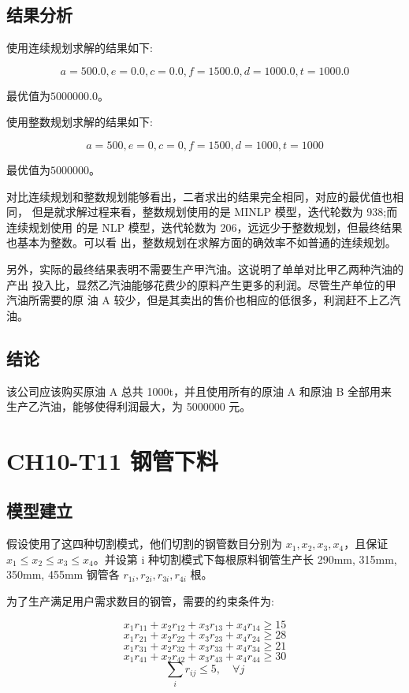 \documentclass{article}
\begin{document}
\subsection{结果分析}

使用连续规划求解的结果如下:

$$a=500.0,e=0.0,c=0.0,f=1500.0,d=1000.0,t=1000.0$$

最优值为$5000000.0$。

使用整数规划求解的结果如下:

$$a=500,e=0,c=0,f=1500,d=1000,t=1000$$

最优值为$5000000$。

对比连续规划和整数规划能够看出，二者求出的结果完全相同，对应的最优值也相同， 但是就求解过程来看，整数规划使用的是 MINLP 模型，迭代轮数为 938;而连续规划使用 的是 NLP 模型，迭代轮数为 206，远远少于整数规划，但最终结果也基本为整数。可以看 出，整数规划在求解方面的确效率不如普通的连续规划。


另外，实际的最终结果表明不需要生产甲汽油。这说明了单单对比甲乙两种汽油的产出 投入比，显然乙汽油能够花费少的原料产生更多的利润。尽管生产单位的甲汽油所需要的原 油 A 较少，但是其卖出的售价也相应的低很多，利润赶不上乙汽油。


\subsection{结论}

该公司应该购买原油 A 总共 1000t，并且使用所有的原油 A 和原油 B 全部用来 生产乙汽油，能够使得利润最大，为 5000000 元。


\section{CH10-T11 钢管下料}

\subsection{模型建立}
假设使用了这四种切割模式，他们切割的钢管数目分别为 $x_1, x_2, x_3, x_4$，且保证 $x_1 \leq x_2 \leq x_3 \leq x_4$。并设第 i 种切割模式下每根原料钢管生产长 290mm, 315mm, 350mm, 455mm 钢管各 $r_{1i}, r_{2i}, r_{3i}, r_{4i}$ 根。

为了生产满足用户需求数目的钢管，需要的约束条件为:

$$x_1r_{11}+x_2r_{12}+x_3r_{13}+x_4r_{14}\geq 15$$
$$x_1r_{21}+x_2r_{22}+x_3r_{23}+x_4r_{24}\geq 28$$
$$x_1r_{31}+x_2r_{32}+x_3r_{33}+x_4r_{34}\geq 21$$
$$x_1r_{41}+x_2r_{42}+x_3r_{43}+x_4r_{44}\geq 30$$
$$\sum_ir_{ij}\leq5,\quad \forall j$$
\end{document}

